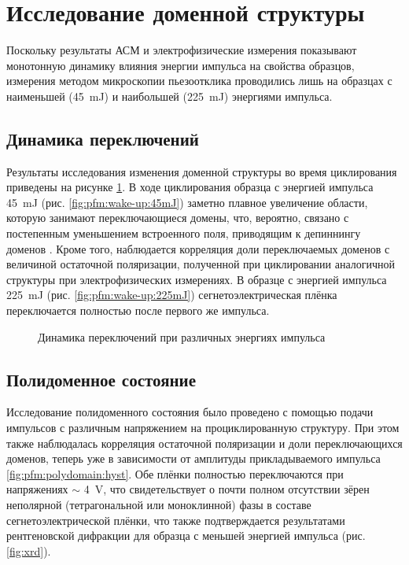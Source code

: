 \section{Исследование доменной структуры}

Поскольку результаты АСМ и электрофизические измерения показывают монотонную динамику влияния энергии импульса на свойства образцов, измерения методом микроскопии пьезоотклика проводились лишь на образцах с наименьшей (\SI{45}{\milli\joule}) и наибольшей (\SI{225}{\milli\joule}) энергиями импульса.

\subsection{Динамика переключений}

Результаты исследования изменения доменной структуры во время циклирования приведены на рисунке \cref{fig:pfm:wake-up}. В ходе циклирования образца с энергией импульса \SI{45}{\milli\joule} (рис. \cref{fig:pfm:wake-up:45mJ}) заметно плавное увеличение области, которую занимают переключающиеся домены, что, вероятно, связано с постепенным уменьшением встроенного поля, приводящим к депиннингу доменов . Кроме того, наблюдается корреляция доли переключаемых доменов с величиной остаточной поляризации, полученной при циклировании аналогичной структуры при электрофизических измерениях. В образце с энергией импульса \SI{225}{\milli\joule} (рис. \cref{fig:pfm:wake-up:225mJ}) сегнетоэлектрическая плёнка переключается полностью после первого же импульса.

\begin{figure}[ht]
    \caption[Этот текст попадает в названия рисунков в списке рисунков]{Динамика переключений при различных энергиях импульса}\label{fig:pfm:wake-up}
\end{figure}

\subsection{Полидоменное состояние}

Исследование полидоменного состояния было проведено с помощью подачи импульсов с различным напряжением на проциклированную структуру. При этом также наблюдалась корреляция остаточной поляризации и доли переключающихся доменов, теперь уже в зависимости от амплитуды прикладываемого импульса \cref{fig:pfm:polydomain:hyst}. Обе плёнки полностью переключаются при напряжениях \(\sim\) \SI{4}{\volt}, что свидетельствует о почти полном отсутствии зёрен неполярной (тетрагональной или моноклинной) фазы в составе сегнетоэлектрической плёнки, что также подтверждается результатами рентгеновской дифракции для образца с меньшей энергией импульса (рис. \cref{fig:xrd}).


